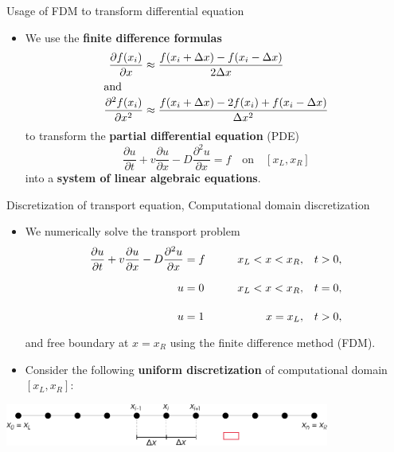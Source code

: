 %
%
\begin{frame}{Usage of FDM to transform differential equation}
\begin{itemize}
\item We use the \alert{\bf finite difference formulas}
\begin{align*}
\frac{\partial f(x_{i})}{\partial x} & \approx\frac{f(x_{i}+\Delta x)-f(x_{i}-\Delta x)}{2\Delta x}\\
\shortintertext{and}\frac{\partial^{2}f(x_{i})}{\partial x^{2}} & \approx\frac{f(x_{i}+\Delta x)-2f(x_{i})+f(x_{i}-\Delta x)}{\Delta x^{2}}
\end{align*}
to transform the \textbf{partial differential equation} (PDE)
\[
\frac{\partial u}{\partial t}+v\frac{\partial u}{\partial x}-D\frac{\partial^{2}u}{\partial x}=f \quad \mbox{on} \quad [x_L, x_R]
\]
into a \textbf{system of linear algebraic equations}.
\end{itemize}
\end{frame}
%
%
\begin{frame}{Discretization of transport equation, Computational domain discretization}
\begin{itemize}
\item We \alert{numerically solve} the transport problem
\begin{alignat*}{4}
\frac{\partial u}{\partial t}+v\frac{\partial u}{\partial x}-D\frac{\partial^{2}u}{\partial x} & =f &  x_L <x<x_R, &\quad t>0,\\
u & =0\qquad \vphantom{\frac{\partial^{2}u}{\partial x}} & x_L< x <x_R, & \quad t=0,\\
u & =1 \vphantom{\frac{\partial^{2}u}{\partial x}} & x=x_L,& \quad t>0,
\end{alignat*}
and free boundary at $x=x_R$ using the \alert{finite difference method (FDM)}.\\[5pt]
%
\item Consider the following \textbf{uniform discretization} of computational  domain $[x_L, x_R]$:
\end{itemize}
%
\vskip 20pt
\begin{center}
\includegraphics[width=0.8\textwidth]{figures/reactive-transport/finite-difference-domain-discretization}
\end{center}

\end{frame}
